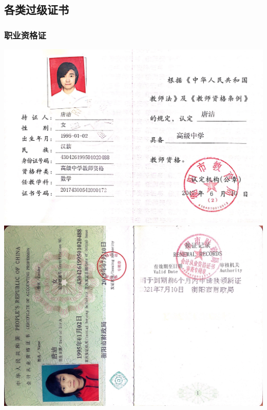 \documentclass[UFT8]{ctexart}%
\begin{document}



\subsection{各类过级证书}
\subsubsection{职业资格证}
\begin{center}
\includegraphics[scale=0.20]{figs/教师资格证.JPG }
\includegraphics[scale=0.2]{figs/20150710.JPG }
\end{center}
\end{document}
